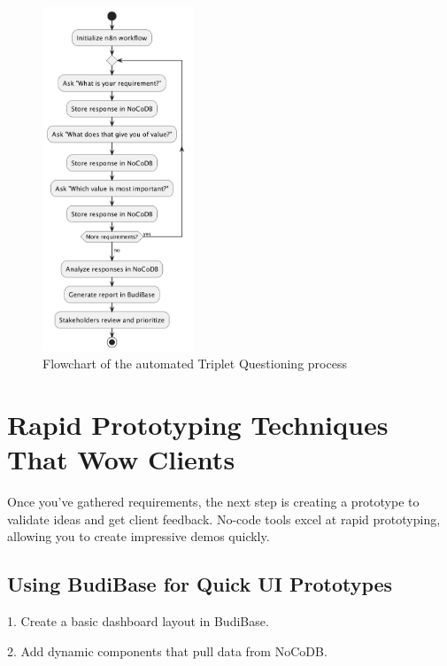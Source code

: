 \begin{figure}
    \centering
    \includegraphics[width=0.40\textwidth]{./figures/03-flowchart-triplet-questioning.png}
    \caption{Flowchart of the automated Triplet Questioning process}
    \label{fig:triplet-questioning}
\end{figure}


\section{Rapid Prototyping Techniques That Wow Clients}

Once you've gathered requirements, the next step is creating a prototype to validate ideas and get client feedback. No-code tools excel at rapid prototyping, allowing you to create impressive demos quickly.

\subsection{Using BudiBase for Quick UI Prototypes}

1. Create a basic dashboard layout in BudiBase.


2. Add dynamic components that pull data from NoCoDB.


